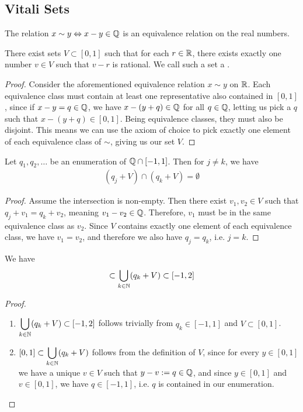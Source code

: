 \subsection{Vitali Sets}
\begin{proposition}
	The relation $x \sim y \Leftrightarrow x - y \in \mathbb{Q}$ is an equivalence relation on the real numbers.
\end{proposition}
\begin{theorem}
	There exist sets $V \subset [0,1]$ such that for each $r \in \mathbb{R}$, there exists exactly one number $v \in V$ such that $v - r$ is rational. We call such a set a .
\end{theorem}
\begin{proof}
	Consider the aforementioned equivalence relation $x \sim y$ on $\mathbb{R}$. Each equivalence class must contain at least one representative also contained in $[0,1]$, since if $x - y  = q \in \mathbb{Q}$, we have $x - (y +  q) \in \mathbb{Q}$ for all $q \in \mathbb{Q}$, letting us pick a $q$ such that $x- (y+q) \in [0,1]$. Being equivalence classes, they must also be disjoint.
	\newpar
	This means we can use the axiom of choice to pick exactly one element of each equivalence class of $\sim$, giving us our set $V$.
\end{proof}
\begin{lemma}
	Let $q_1, q_2, \hdots$ be an enumeration of $\mathbb{Q} \cap [-1,1]$. Then for $j \neq k$, we have
	\begin{align*}
		(q_j + V) \cap (q_k + V) = \emptyset
	\end{align*}
\end{lemma}
\begin{proof}
	Assume the intersection is non-empty. Then there exist $v_1,v_2 \in V$ such that $q_j + v_1 = q_k + v_2$, meaning $v_1 - v_2 \in \mathbb{Q}$. Therefore, $v_1$ must be in the same equivalence class as $v_2$. Since $V$ contains exactly one element of each equivalence class, we have $v_1 = v_2$, and therefore we also have $q_j = q_k$, i.e. $j = k$.
\end{proof}
\begin{lemma}
	We have
	\begin{align*}
		[0,1] \subset \bigcup_{k \in \bN} (q_k + V) \subset [-1,2]
	\end{align*}
\end{lemma}
\begin{proof}
	\begin{enumerate}
		\item $\displaystyle \bigcup_{k \in \mathbb{N}} (q_k + V) \subset [-1,2]$ follows trivially from $q_k \in [-1,1]$ and $V \subset [0,1]$.
		\item $\displaystyle [0,1] \subset \bigcup_{k \in \mathbb{N}} (q_k + V)$ follows from the definition of $V$, since for every $y \in [0,1]$ we have a unique $v \in V$ such that $y-v := q \in \mathbb{Q}$, and since $y \in [0,1]$ and $v \in [0,1]$, we have $q \in [-1,1]$, i.e. $q$ is contained in our enumeration.
	\end{enumerate}
\end{proof}
